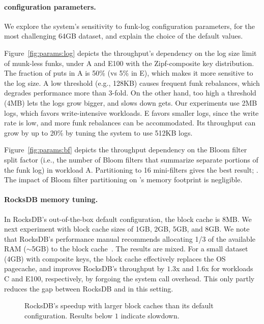 \paragraph{\sys\/ configuration parameters.} 
We explore the system's  sensitivity to funk-log configuration parameters, for the most challenging 64GB dataset, 
and explain the choice of the default values.

Figure~\ref{fig:params:log} depicts the throughput's dependency on the log size limit of munk-less funks, 
under  A and E100  with the Zipf-composite key distribution. 
The fraction of puts in A is 50\% (vs 5\% in E), which makes it more sensitive to the log size. 
A low threshold (e.g., 128KB) causes frequent funk rebalances, which degrades performance more than 3-fold. 
On the other hand, too high a threshold (4MB) lets the logs grow bigger, and slows down gets. Our experiments  
use 2MB logs, which favors write-intensive workloads. E favors smaller logs, since the write 
rate is low, and more funk rebalances can be accommodated. Its throughput can  grow by up to 20\% 
by tuning the system to use 512KB logs.

Figure~\ref{fig:params:bf} depicts the throughput dependency on the Bloom filter split factor (i.e., the 
number of Bloom filters that summarize separate portions of the funk log) in workload A. 
Partitioning to 16 mini-filters gives the best result; . 
The impact of Bloom filter partitioning on \sys's %
memory footprint is negligible.

\paragraph{RocksDB memory tuning.} In RocksDB's out-of-the-box default configuration, the block cache is 8MB. 
We next experiment with block cache sizes of 1GB, 2GB, 5GB, and 8GB. We note that 
RocksDB's performance manual recommends allocating 1/3 of the available RAM 
($\sim$5GB) to the block cache~\cite{RocksDBMemoryTuning}.
The results are mixed. For a small 
dataset (4GB) with composite keys, the block cache effectively replaces 
the OS pagecache, and improves RocksDB's throughput by $1.3$x and 1.6x
for workloads C and E100, respectively, by forgoing the system call overhead. This only partly reduces the gap between
RocksDB and \sys\/ in this setting. 

\begin{figure}[htb]
\caption{RocksDB's speedup with larger block caches than its default configuration. Results below $1$ indicate slowdown.}
\label{fig:rocks-memory}
\end{figure}

